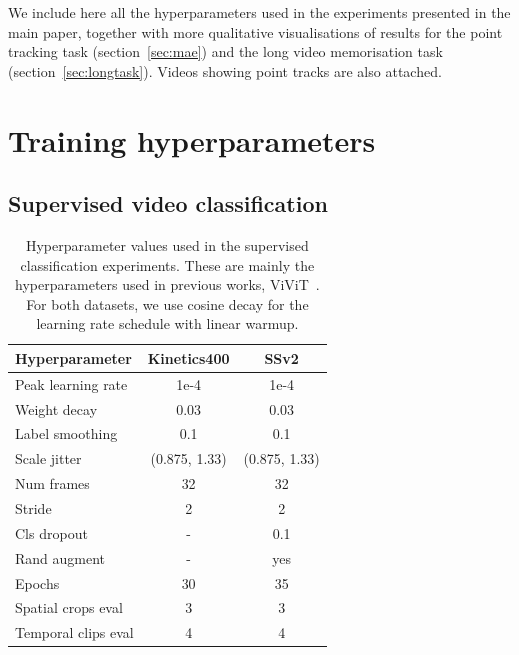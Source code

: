 \clearpage
\setcounter{page}{1}
\maketitlesupplementary

We include here all the hyperparameters used in the experiments presented in the main paper, together with more qualitative visualisations of  results for the point tracking task (section~\ref{sec:mae}) and the long video memorisation task (section~\ref{sec:longtask}). Videos showing point tracks are also attached. 

\section{Training hyperparameters}
\label{sec:hyper}

\subsection{Supervised video classification}

\begin{table}[h!]
    \centering
    \begin{tabular}{l|c|c}
     \textbf{Hyperparameter} & \textbf{Kinetics400} & \textbf{SSv2} \\
     \hline
      Peak learning rate  & 1e-4 & 1e-4 \\
      Weight decay & 0.03 & 0.03 \\
      Label smoothing & 0.1 & 0.1 \\
      Scale jitter & (0.875, 1.33) & (0.875, 1.33) \\
      Num frames & 32 & 32 \\
      Stride & 2 & 2 \\
      Cls dropout & - & 0.1 \\
      Rand augment & - & yes \\
      Epochs & 30 & 35 \\
      Spatial crops eval & 3 & 3 \\
      Temporal clips eval & 4 & 4\\
      \hline
    \end{tabular}
    \caption{Hyperparameter values used in the supervised classification experiments. These are mainly the hyperparameters used in previous works, \eg ViViT~\cite{vivit}. For both datasets, we use cosine decay for the learning rate schedule with linear warmup.}
    \label{tab:hyperssup}
\end{table}

